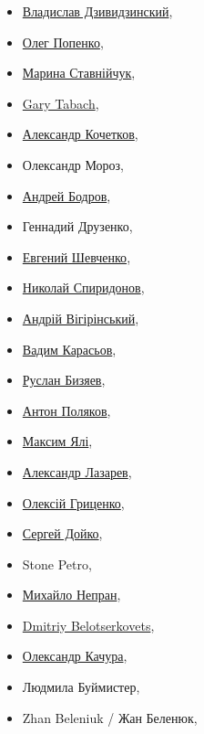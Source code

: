 \begin{multicols}{2}
\begin{itemize}
  \item \href{https://www.facebook.com/vladislav.dzividzinskiy}{Владислав Дзивидзинский},
  \item \href{https://www.facebook.com/profile.php?id=100001729759345}{Олег Попенко}, 
  \item \href{https://www.facebook.com/profile.php?id=100005289129370}{Марина Ставнійчук}, 
  \item \href{https://www.facebook.com/gary.tabach.33}{Gary Tabach}, 
  \item \href{https://www.facebook.com/Александр-Кочетков-277846527400654/}{Александр Кочетков}, 
  \item Олександр Мороз, 
  \item \href{https://www.facebook.com/profile.php?id=1673971989}{Андрей Бодров}, 
  \item Геннадий Друзенко, 
  \item \href{https://www.facebook.com/e.shevchenko76}{Евгений Шевченко}, 
  \item \href{https://www.facebook.com/nik.spiridonov.7}{Николай Спиридонов},
  \item \href{https://www.facebook.com/a.vigirinskiy}{Андрій Вігірінський}, 
  \item \href{https://www.facebook.com/vadim.karasev}{Вадим Карасьов},
  \item \href{https://www.facebook.com/ruslan.bizyaev.7}{Руслан Бизяев}, 
  \item \href{https://www.facebook.com/anton.polyakov.98}{Антон Поляков}, 
  \item \href{https://www.facebook.com/profile.php?id=100004292079149}{Максим Ялі}, 
  \item \href{https://www.facebook.com/profile.php?id=100008532614385}{Александр Лазарев}, 
  \item \href{https://www.facebook.com/grytsenko.alex}{Олексій Гриценко},
  \item \href{https://www.facebook.com/sdoyko}{Сергей Дойко}, 
  \item Stone Petro, 
  \item \href{https://www.facebook.com/TppNepran}{Михайло Непран}, 
  \item \href{https://www.facebook.com/dbelotserkovets}{Dmitriy Belotserkovets}, 
  \item \href{https://www.facebook.com/kachuratut}{Олександр Качура}, 
  \item Людмила Буймистер, 
  \item Zhan Beleniuk / Жан Беленюк, 

\end{itemize}
\end{multicols}
